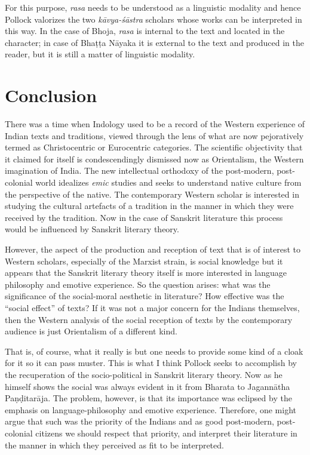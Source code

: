 For this purpose, \textsl{rasa} needs to be understood as a linguistic modality and hence Pollock
 valorizes the two \textsl{kāvya-śāstra} scholars whose works can be interpreted in this way. In the case of Bhoja, \textsl{rasa} is internal to the text and located in the character; in case of Bhaṭṭa Nāyaka it is external to the text and produced in the reader, but it is still a matter of linguistic modality. 

\section*{Conclusion}

There was a time when Indology used to be a record of the Western experience of Indian texts and traditions, viewed through the lens of what are now pejoratively termed as Christocentric or Eurocentric categories. The scientific objectivity that it claimed for itself is condescendingly dismissed now as Orientalism, the Western imagination of India. The new intellectual orthodoxy of the post-modern, post-colonial world idealizes \textsl{emic} studies and seeks to understand native culture from the perspective of the native. The contemporary Western scholar is interested in studying the cultural artefacts of a tradition in the manner in which they were received by the tradition. Now in the case of Sanskrit literature this process would be influenced by Sanskrit literary theory. 

However, the aspect of the production and reception of text that is of interest to Western scholars, especially of the Marxist strain, is social knowledge but it appears that the Sanskrit literary theory itself is more interested in language philosophy and emotive experience. So the question arises: what was the significance of the social-moral aesthetic in literature? How effective was the ``social effect'' of texts? If it was not a major concern for the Indians themselves, then the Western analysis of the social reception of texts by the contemporary audience is just Orientalism of a different kind.

That is, of course, what it really is but one needs to provide some kind of a cloak for it so it can pass muster. This is what I think Pollock seeks to accomplish by the recuperation of the socio-political in Sanskrit literary theory. Now as he himself shows the social was always evident in it from Bharata to Jagannātha Paṇḍitarāja. The problem, however, is that its importance was eclipsed by the emphasis on language-philosophy and emotive experience. Therefore, one might argue that such was the priority of the Indians and as good post-modern, post-colonial citizens we should respect that priority, and interpret their literature in the manner in which they perceived as fit to be interpreted. 


